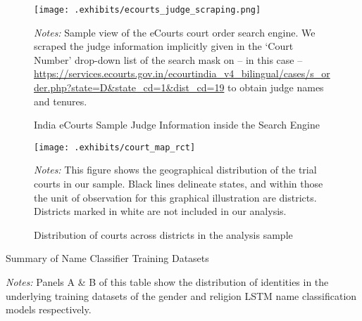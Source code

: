 \documentclass[12pt,english]{article}
\begin{document}
\begin{appendices}
\begin{figure}[htp!]
 \centering
 \caption{India eCourts Sample Judge Information inside the Search Engine}
 \texttt{[image: .exhibits/ecourts\_judge\_scraping.png]}
 \label{fig:ecourts_judge_scraping}
 \begin{minipage}{1.0\textwidth}
    {\scriptsize \emph{Notes:} Sample view of the eCourts court order search engine. We scraped the judge information implicitly given in the `Court Number' drop-down list of the search mask on -- in this case -- \url{https://services.ecourts.gov.in/ecourtindia_v4_bilingual/cases/s_order.php?state=D&state_cd=1&dist_cd=19} to obtain judge names and tenures.\par}
 \end{minipage}
\end{figure}


\begin{figure}
    \centering
    \caption{Distribution of courts across districts in the analysis sample}
    \texttt{[image: .exhibits/court\_map\_rct]} 
    \label{fig:court_maps}
     \begin{minipage}{1.0\textwidth}
    {\scriptsize \emph{Notes:} This figure shows the geographical distribution of the trial courts in our sample. Black lines delineate states, and within those the unit of observation for this graphical illustration are districts. Districts marked in white are not included in our analysis.\par}
 \end{minipage}
\end{figure}

\newpage

\begin{table}
  \begin{center}
  \caption{Summary of Name Classifier Training Datasets}
  \label{tab:training}
  
  \end{center}
   \begin{minipage}{1.0\textwidth}
    {\scriptsize \emph{Notes:} Panels A \& B of this table show the distribution of identities in the underlying training datasets of the gender and religion LSTM name classification models respectively.\par}
 \end{minipage}
\end{table}


\end{appendices}
\end{document}
